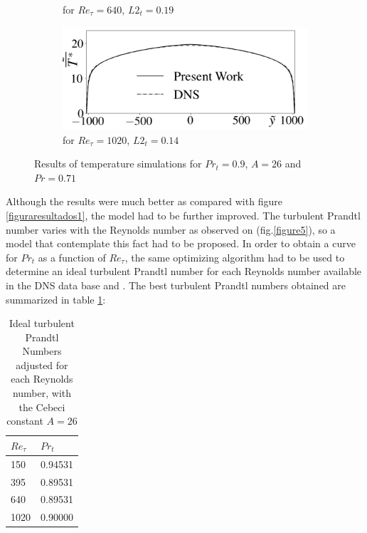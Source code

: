 \documentclass[10pt]{article} %
\begin{document}
\begin{figure}[!h]
\begin{subfigure}[t]{0.5\textwidth}
		\caption{for $Re_\tau = 640$, $L2_t = 0.19$}
	\end{subfigure}
	\begin{subfigure}[t]{0.45\textwidth}
		\centering
		\includegraphics[angle=0, scale=0.24]{fotos_formatacao_final/Temperature_1000_071_Prt0905_A26}
		\caption{for $Re_\tau = 1020$, $L2_t = 0.14$}
	\end{subfigure}	
	\caption{Results of temperature simulations for $Pr_t = 0.9 $, $A = 26$ and $Pr =0.71$ }
	\label{primeiros}
\end{figure}

Although the results were much better as compared with figure \ref{figuraresultados1}, the model had to be further improved. The turbulent Prandtl number varies with the Reynolds number as observed on (fig.\ref{figure5}), so a model that contemplate this fact had to be proposed. 
In order to obtain a curve for $Pr_t$ as a function of $Re_\tau$, the same optimizing algorithm had to be used to determine an ideal turbulent Prandtl number for each Reynolds number available in the DNS data base \cite{DNS1020} and \cite{DNS150}.
The best turbulent Prandtl numbers obtained are summarized in table \ref{tabela1}:

\begin{table}[!h]
	\centering
	\caption{Ideal turbulent Prandtl Numbers adjusted for each Reynolds number, with the Cebeci constant $A = 26$}
	\begin{tabular}{ll}
		  \hline
		  $Re_\tau$ & $Pr_t$\\
		  \hline
		  150  &   0.94531\\
		  395  &   0.89531\\
		  640  &   0.89531\\
		  1020 &   0.90000\\ 
		  \hline
	\end{tabular}
	\label{tabela1}
\end{table}
\end{document}
